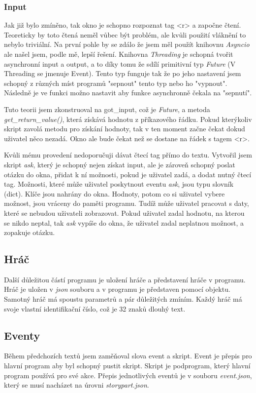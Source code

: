 \documentclass[12pt,a4paper]{article}
\begin{document}
\subsubsection{Input}
Jak již bylo zmíněno, tak okno je schopno rozpoznat tag <r> a započne čtení. Teoreticky by toto čtená neměl vůbec být problém, ale kvůli použití vláknění to nebylo triviální. Na první pohle by se zdálo že jsem měl použít knihovnu \textit{Asyncio} ale našel jsem, podle mě, lepší řešení. Knihovna \textit{Threading} je schopná tvořit asynchronní input a output, a to díky tomu že sdílí primitivní typ \textit{Future} (V Threading se jmenuje Event). Tento typ funguje tak že po jeho nastavení jsem schopný z různých míst programů "sepnout" tento typ nebo ho "vypnout". Následně je ve funkci možno nastavit aby funkce asynchronně čekala na "sepnutí".

Tuto teorii jsem zkonstruoval na got\_input, což je \textit{Future}, a metoda \textit{get\_return\_value()}, která získává hodnotu z příkazového řádku. Pokud kterýkoliv skript zavolá metodu pro získání hodnoty, tak v ten moment začne čekat dokud uživatel něco nezadá. Okno ale bude čekat než se dostane na řádek s tagem <r>.

Kvůli mému provedení nedoporučuji dávat čtecí tag přímo do textu. Vytvořil jsem skript \textit{ask}, který je schopný nejen získat input, ale je zároveň schopný poslat otázku do okna, přidat k ní možnosti, pokud je uživatel zadá, a dodat nutný čtecí tag. Možnosti, které může uživatel poskytnout eventu \textit{ask}, jsou typu slovník (dict). Klíče jsou nahrány do okna. Hodnoty, potom co si uživatel vybere možnost, jsou vráceny do paměti programu. Tudíž může uživatel pracovat s daty, které se nebudou uživateli zobrazovat. Pokud uživatel zadal hodnotu, na kterou se nikdo neptal, tak \textit{ask} vypíše do okna, že uživatel zadal neplatnou možnost, a zopakuje otázku.
\subsection{Hráč}
Další důležitou částí programu je uložení hráče a představení hráče v programu. Hráč je uložen v \textit{json} souboru a v programu je představen pomocí objektu. Samotný hráč má spoustu parametrů a pár důležitých zmíním. Každý hráč má svoje vlastní identifikační číslo, což je 32 znaků dlouhý text. 

\subsection{Eventy}
Během předchozích textů jsem zaměňoval slova event a skript. Event je přepis pro hlavní program aby byl schopný pustit skript. Skript je podprogram, který hlavní program používá pro své akce. Přepis jednotlivých eventů je v souboru \textit{event.json}, který se musí nacházet na úrovni \textit{storypart.json}.
\end{document}
